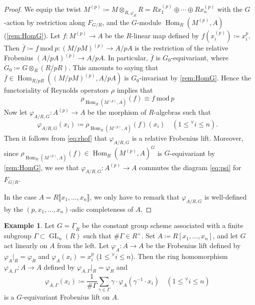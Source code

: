 \documentclass[uplatex,11pt,a4paper]{amsart} %
\numberwithin{equation}{section}
\numberwithin{figure}{section}
\numberwithin{table}{section}
\theoremstyle{plain}
\theoremstyle{definition}
\newtheorem{example}[theorem]{Example}
\newcommand{\ol}{\overline}
\newcommand{\ul}{\underline}
\DeclareMathOperator{\GL}{GL}
\DeclareMathOperator{\Hom}{Hom}
\begin{document}
\begin{proof}
We equip the twist $M^{(p)}\coloneqq M\otimes_{R,\varphi_R}R=Rx_1^{(p)}\oplus\cdots\oplus Rx_n^{(p)}$ with the $G$-action by restriction along $F_{G/R}$, and the $G$-module $\Hom_R(M^{(p)},A)$ (\cref{rem:HomG}).
Let $f\colon M^{(p)}\to A$ be the $R$-linear map defined by $f(x_i^{(p)})\coloneqq x_i^p$.
Then $\ol{f}\coloneqq f\ \mathrm{mod}\ p \colon (M/pM)^{(p)}\to A/pA$ is the restriction of the relative Frobenius $(A/pA)^{(p)}\to A/pA$. In particular, $\ol{f}$ is $G_0$-equivariant, where $G_0\coloneqq G\otimes_R(R/pR)$. This amounts to saying that $\ol{f}\in\Hom_{R/pR}((M/pM)^{(p)},A/pA)$ is $G_0$-invariant by \cref{rem:HomG}. Hence the functoriality of Reynolds operators $\rho$ implies that
\begin{equation}
\label{eq:rhof}
\rho_{\Hom_R(M^{(p)},A)}(f)\equiv f\ \mathrm{mod}\ p
\end{equation}
Now let $\varphi_{A/R,G}\colon A^{(p)}\to A$ be the morphism of $R$-algebras such that
\[
\varphi_{A/R,G}(x_i) \coloneqq \rho_{\Hom_R(M^{(p)},A)}(f)(x_i)\quad (1\leq{}^\forall i\leq n).
\]
Then it follows from \eqref{eq:rhof} that $\varphi_{A/R,G}$ is a relative Frobenius lift. Moreover, since $\rho_{\Hom_R(M^{(p)},A)}(f)\in\Hom_R(M^{(p)},A)^G$ is $G$-equivariant by \cref{rem:HomG}, we see that $\varphi_{A/R,G}\colon A^{(p)}\to A$ commutes the diagram \eqref{eq:psi} for $F_{G/R}$.

In the case $A=R\llbracket x_1,\ldots,x_n\rrbracket$, we only have to remark that $\varphi_{A/R,G}$ is well-defined by the $(p,x_1,\ldots,x_n)$-adic completeness of $A$.
\end{proof}

\begin{example}
Let $G=\ul{\Gamma}_R$ be the constant group scheme associated with a finite subgroup $\Gamma\subset\GL_n(R)$ such that $\#\Gamma\in R^\times$.
Set $A\coloneqq R[x_1,\ldots,x_n]$, and let $G$ act linearly on $A$ from the left. Let $\varphi_A\colon A\to A$ be the Frobenius lift defined by $\varphi_A|_R=\varphi_R$ and $\varphi_A(x_i)=x_i^p$ ($1\leq{}^\forall i\leq n$). Then the ring homomorphism $\varphi_{A,\Gamma}\colon A\to A$ defined by $\varphi_{A,\Gamma}|_R = \varphi_R$ and
\[
\varphi_{A,\Gamma}(x_i)\coloneqq \frac{1}{\#\Gamma}\sum_{\gamma\in \Gamma}\gamma\cdot \varphi_A(\gamma^{-1}\cdot x_i)\quad (1\leq{}^\forall i\leq n)
\]
is a $G$-equivariant Frobenius lift on $A$.
\end{example}
\end{document}
